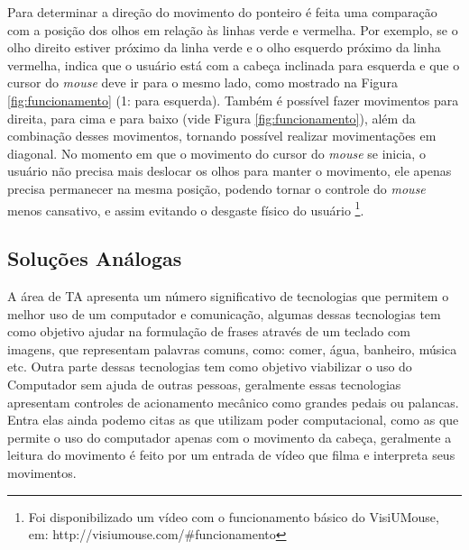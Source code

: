 Para determinar a direção do movimento do ponteiro é feita uma comparação com a posição dos olhos em relação às linhas verde e vermelha. Por exemplo, se o olho direito estiver próximo da linha verde e o olho esquerdo próximo da linha vermelha, indica que o usuário está com a cabeça inclinada para esquerda e que o cursor do \textit{mouse} deve ir para o mesmo lado, como mostrado na Figura \ref{fig:funcionamento} (1: para esquerda). Também é possível fazer movimentos para direita, para cima e para baixo (vide Figura \ref{fig:funcionamento}), além da combinação desses movimentos, tornando possível realizar movimentações em diagonal. No momento em que o movimento do cursor do \textit{mouse} se inicia, o usuário não precisa mais deslocar os olhos para manter o movimento, ele apenas precisa permanecer na mesma posição, podendo tornar o controle do \textit{mouse} menos cansativo, e assim evitando o desgaste físico do usuário \footnote{Foi disponibilizado um vídeo com o funcionamento básico do VisiUMouse, em: http://visiumouse.com/\#funcionamento}. 




\subsection{Soluções Análogas}\label{Sub:tabela-comparativa}
% 
% 
A área de TA apresenta um número significativo de tecnologias que permitem o melhor uso de um computador e comunicação, algumas dessas tecnologias tem como objetivo ajudar na formulação de frases através de um teclado com imagens, que representam palavras comuns, como: comer, água, banheiro, música etc. Outra parte dessas tecnologias tem como objetivo viabilizar o uso do Computador sem ajuda de outras pessoas, geralmente essas tecnologias apresentam controles de acionamento mecânico como grandes pedais ou palancas. Entra elas ainda podemo citas as que utilizam poder computacional, como as que permite o uso do computador apenas com o movimento da cabeça, geralmente a leitura do movimento é feito por um  entrada de vídeo que filma e interpreta seus movimentos.

